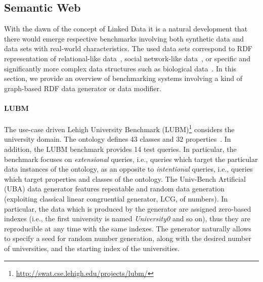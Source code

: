 \subsection{Semantic Web}
\label{sec:generators_LinkedData}
With the dawn of the concept of Linked Data it is a natural development that there would emerge respective 
benchmarks involving both synthetic data and  data sets   with real-world characteristics. 
The used data sets correspond to RDF representation of relational-like data~\cite{Guo2005158,Bizer09theberlin}, social network-like data~\cite{Schmidt2010}, or specific and significantly more complex data structures such as biological data~\cite{Wu2014}. In this section, we provide an overview of benchmarking systems involving a kind of graph-based RDF data generator or data modifier. %


\iffalse
Considering the Big Data world, the Linked Data in general definitely belong to this group since we assume that the Linked (Open) Data Sets form a common Linked Open Data cloud\footnote{\url{http://lod-cloud.net/}}. On the other hand, the particular data sets can be relatively small.
\fi

\paragraph{LUBM} The use-case driven Lehigh University Benchmark (LUBM)\footnote{\url{http://swat.cse.lehigh.edu/projects/lubm/}} considers the university domain. The ontology defines 43 classes and 32 properties~\cite{Guo2005158}. In addition, the LUBM benchmark provides 14 test queries. In particular, the benchmark focuses on \emph{extensional} queries, i.e., queries which target the particular data instances of the ontology, as an opposite to \emph{intentional} queries, i.e., queries which target properties and classes of the ontology. The Univ-Bench Artificial  (UBA) data generator features repeatable and random  data generation (exploiting classical linear congruential generator, LCG, of numbers). In particular, the data which is produced by the generator are assigned zero-based indexes (i.e., the first university is named \emph{University0} and so on), thus they are reproducible at any time with the same indexes.  The generator naturally allows to specify a seed for random number generation, along with the desired number of universities, and the starting index of the universities.

